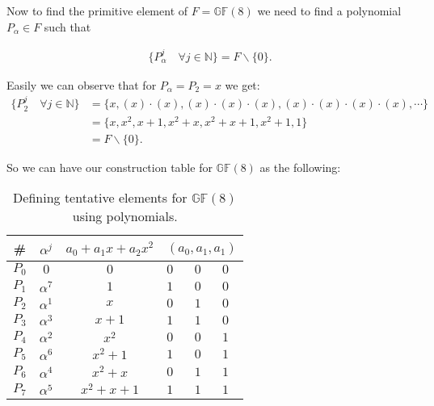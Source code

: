 \documentclass[12pt]{article}
\newcommand{\gf}[1]{\mathds{GF}\left(#1\right)} %
\begin{document}
Now to find the primitive element of $F = \gf{8}$ we need to find a polynomial $P_{\alpha} \in F$ such that 

\begin{align*}
	\{ P_{\alpha}^{j} \quad \forall j\in \mathds{N} \} = F\backslash \{0\} .
\end{align*}
 
Easily we can observe that for $P_\alpha = P_2 = x$ we get:
\begin{align*}
\{ P_{2}^{j} \quad \forall j\in \mathds{N} \} &= \{ x, (x)\cdot(x), (x)\cdot(x)\cdot(x), (x)\cdot(x)\cdot(x)\cdot(x),  \cdots   \} \\
& = \{x, x^2 , x+1 , x^2 + x , x^2 + x + 1 , x^2+1 , 1 \} \\
& = F \backslash \{0\} .
\end{align*}

So we can have our construction table for $\gf{8}$ as the following:
 
\begin{table}[h]
	\centering
	\begin{tabular}{|c|c|c|m{1em}|m{1em}|m{1em}|}
		\hline 
		\# & $\alpha^j$ &$a_0 + a_1 x + a_2 x^2$ &  \multicolumn{3}{c|}{$(a_0, a_1, a_1)$}  \\ 
		\hline \hline 
		$P_0$ & $0$ & $0$ & $0$ & $0$ & $0$ \\ 
		\hline 
		$P_1$ & $\alpha^7$ & $1$ & $1$ & $0$ & $0$ \\ 
		\hline 
		$P_2$ & $\alpha^1$ & $x$ & $0$ & $1$ & $0$ \\ 
		\hline 
		$P_3$ & $\alpha^3$ & $x+1$ & $1$ & $1$ & $0$ \\ 
		\hline 
		$P_4$ & $\alpha^2$ & $x^2$ & $0$ & $0$ & $1$ \\ 
		\hline 
		$P_5$ & $\alpha^6$ & $x^2+1$ & $1$ & $0$ & $1$ \\ 
		\hline 
		$P_6$ & $\alpha^4$ & $x^2 + x$ & $0$ & $1$ & $1$ \\ 
		\hline 
		$P_7$ & $\alpha^5$ & $x^2 + x +1$ & $1$ & $1$ & $1$ \\ 
		\hline 
	\end{tabular} 
	\caption{Defining tentative elements for $\gf{8}$ using polynomials.}
\end{table} 
 
\newpage
 
\end{document}
